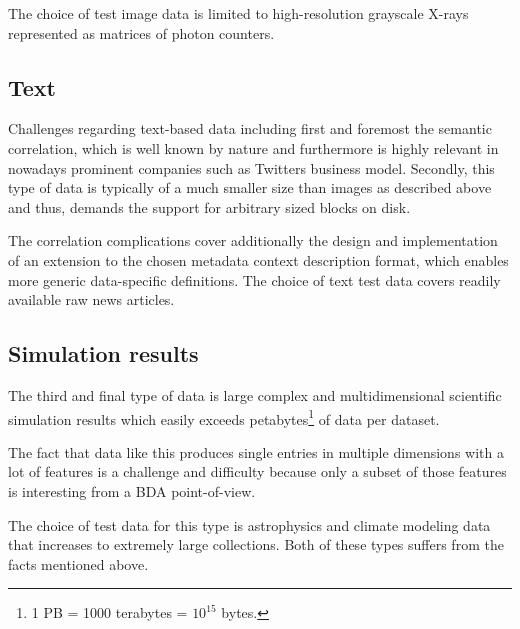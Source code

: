 The choice of test image data is limited to high-resolution grayscale X-rays represented as matrices of photon counters.

\subsection*{Text}
Challenges regarding text-based data including first and foremost the semantic correlation, which is well known by nature and furthermore is highly relevant in nowadays prominent companies such as Twitters business model. Secondly, this type of data is typically of a much smaller size than \eg images as described above and thus, demands the support for arbitrary sized blocks on disk. 
\newline

The correlation complications cover additionally the design and implementation of an extension to the chosen metadata context description format, which enables more generic data-specific definitions. The choice of text test data covers \eg readily available raw news articles.

\subsection*{Simulation results}
The third and final type of data is large complex and multidimensional scientific simulation results which easily exceeds petabytes\footnote{1 PB =  1000 terabytes = $10^{15}$ bytes.} of data per dataset. 

The fact that data like this produces single entries in multiple dimensions with a lot of features is a challenge and difficulty because only a subset of those features is interesting from a BDA point-of-view.

The choice of test data for this type is astrophysics and climate modeling data that increases to extremely large collections. Both of these types suffers from the facts mentioned above.